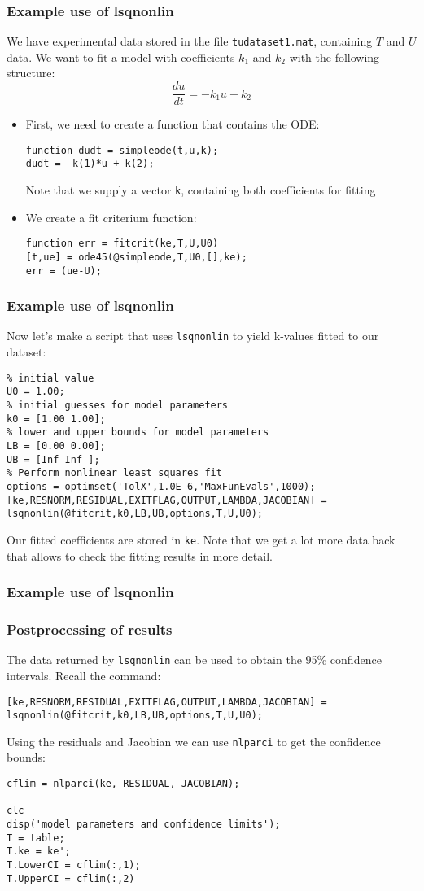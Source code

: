 \begin{frame}[fragile] 
  \frametitle{Example use of lsqnonlin}
  We have experimental data stored in the file \lstinline$tudataset1.mat$, containing $T$ and $U$ data. We want to fit a model with coefficients $k_1$ and $k_2$ with the following structure:
  \[
    \frac{du}{dt} = -k_1 u + k_2
  \]
  \pause
  \begin{itemize}
    \item First, we need to create a function that contains the ODE:
    \begin{lstlisting}
function dudt = simpleode(t,u,k);
dudt = -k(1)*u + k(2);
    \end{lstlisting}
    Note that we supply a vector \lstinline$k$, containing both coefficients for fitting
    \pause
    \item We create a fit criterium function:
    \begin{lstlisting}
function err = fitcrit(ke,T,U,U0)
[t,ue] = ode45(@simpleode,T,U0,[],ke);
err = (ue-U);
    \end{lstlisting}
  \end{itemize}
\end{frame}

\begin{frame}[fragile] 
  \frametitle{Example use of lsqnonlin}
  Now let's make a script that uses \lstinline$lsqnonlin$ to yield k-values fitted to our dataset:
  \pause
  \begin{lstlisting}
% initial value
U0 = 1.00;
% initial guesses for model parameters
k0 = [1.00 1.00];
% lower and upper bounds for model parameters
LB = [0.00 0.00];
UB = [Inf Inf ];
% Perform nonlinear least squares fit
options = optimset('TolX',1.0E-6,'MaxFunEvals',1000);
[ke,RESNORM,RESIDUAL,EXITFLAG,OUTPUT,LAMBDA,JACOBIAN] = lsqnonlin(@fitcrit,k0,LB,UB,options,T,U,U0);
    \end{lstlisting}
    Our fitted coefficients are stored in \lstinline$ke$. Note that we get a lot more data back that allows to check the fitting results in more detail.
\end{frame}


\begin{frame}[fragile] 
  \frametitle{Example use of lsqnonlin}
  \centering
\end{frame}

\begin{frame}[fragile] 
  \frametitle{Postprocessing of results}
  The data returned by \lstinline{lsqnonlin} can be used to obtain the 95\% confidence intervals. Recall the command:
  \begin{lstlisting}
[ke,RESNORM,RESIDUAL,EXITFLAG,OUTPUT,LAMBDA,JACOBIAN] = lsqnonlin(@fitcrit,k0,LB,UB,options,T,U,U0);
  \end{lstlisting}
    Using the residuals and Jacobian we can use \lstinline{nlparci} to get the confidence bounds:
    \begin{lstlisting}
cflim = nlparci(ke, RESIDUAL, JACOBIAN);

clc
disp('model parameters and confidence limits');
T = table;
T.ke = ke';
T.LowerCI = cflim(:,1);
T.UpperCI = cflim(:,2)\end{lstlisting}
\end{frame}

